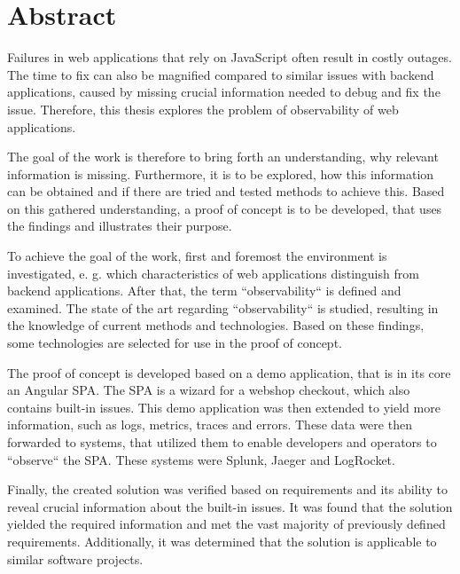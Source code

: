 \newpage{}

\section*{\thispagestyle{empty}Abstract}

Failures in web applications that rely on JavaScript often result in costly outages. The time to fix can also be magnified compared to similar issues with backend applications, caused by missing crucial information needed to debug and fix the issue. Therefore, this thesis explores the problem of observability of web applications.

The goal of the work is therefore to bring forth an understanding, why relevant information is missing. Furthermore, it is to be explored, how this information can be obtained and if there are tried and tested methods to achieve this. Based on this gathered understanding, a proof of concept is to be developed, that uses the findings and illustrates their purpose.

To achieve the goal of the work, first and foremost the environment is investigated, e. g. which characteristics of web applications distinguish from backend applications. After that, the term ``observability`` is defined and examined. The state of the art regarding ``observability`` is studied, resulting in the knowledge of current methods and technologies. Based on these findings, some technologies are selected for use in the proof of concept.

The proof of concept is developed based on a demo application, that is in its core an Angular SPA. The SPA is a wizard for a webshop checkout, which also contains built-in issues. This demo application was then extended to yield more information, such as logs, metrics, traces and errors. These data were then forwarded to systems, that utilized them to enable developers and operators to ``observe`` the SPA. These systems were Splunk, Jaeger and LogRocket.

Finally, the created solution was verified based on requirements and its ability to reveal crucial information about the built-in issues. It was found that the solution yielded the required information and met the vast majority of previously defined requirements. Additionally, it was determined that the solution is applicable to similar software projects.
